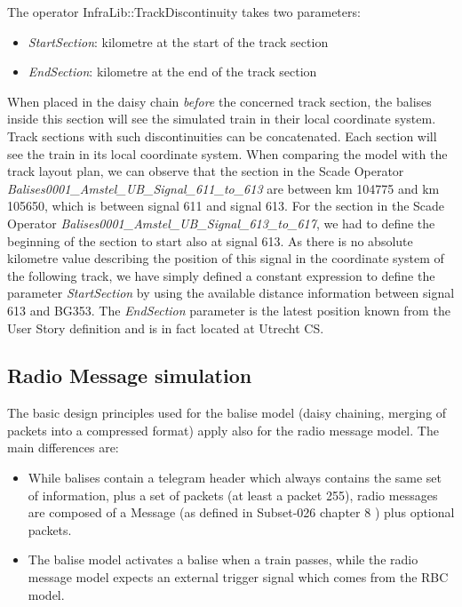 \documentclass{template/openetcs_article}
\begin{document}
The operator InfraLib::TrackDiscontinuity takes two parameters:
\begin{itemize}
 \item \emph{StartSection}: kilometre at the start of the track section
 \item \emph{EndSection}: kilometre at the end of the track section
\end{itemize}
When placed in the daisy chain \emph{before} the concerned track section, the balises inside this section will see the simulated train in their local coordinate system. Track sections with such discontinuities can be concatenated. Each section will see the train in its local coordinate system.\newline\newline
When comparing the model with the track layout plan, we can observe that the section in the Scade Operator  \emph{Balises0001\_Amstel\_UB\_Signal\_611\_to\_613} are between km 104775 and km 105650, which is between signal 611 and signal 613.\newline\newline
For the section in the Scade Operator  \emph{Balises0001\_Amstel\_UB\_Signal\_613\_to\_617}, we had to define the beginning of the section to start also at signal 613. As there is no absolute kilometre value describing the position of this signal in the coordinate system of the following track, we have simply defined a constant expression to define the parameter \emph{StartSection} by using the available distance information between signal 613 and BG353. The \emph{EndSection} parameter is the latest position known from the User Story definition and is in fact located at Utrecht CS.

\subsection{Radio Message simulation}

The basic design principles used for the balise model (daisy chaining, merging of packets into a compressed format) apply also for the radio message model.\newline
The main differences are:
\begin{itemize}
 \item While balises contain a telegram header which always contains the same set of information, plus a set of packets (at least a packet 255), radio messages are composed of a Message (as defined in Subset-026 chapter 8 \cite{SRS026-8}) plus optional packets. 
 \item The balise model activates a balise when a train passes, while the radio message model expects an external trigger signal which comes from the RBC model.
\end{itemize}
\end{document}
